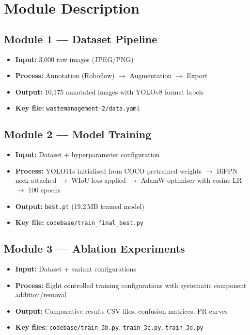 \section{Module Description}

\subsection{Module 1 — Dataset Pipeline}

\begin{itemize}
    \item \textbf{Input:} 3,000 raw images (JPEG/PNG)
    \item \textbf{Process:} Annotation (Roboflow) $\rightarrow$ Augmentation $\rightarrow$ Export
    \item \textbf{Output:} 10,175 annotated images with YOLOv8 format labels
    \item \textbf{Key file:} \texttt{wastemanagement-2/data.yaml}
\end{itemize}

\subsection{Module 2 — Model Training}

\begin{itemize}
    \item \textbf{Input:} Dataset + hyperparameter configuration
    \item \textbf{Process:} YOLO11s initialised from COCO pretrained weights $\rightarrow$ BiFPN neck attached $\rightarrow$ WIoU loss applied $\rightarrow$ AdamW optimiser with cosine LR $\rightarrow$ 100 epochs
    \item \textbf{Output:} \texttt{best.pt} (19.2\,MB trained model)
    \item \textbf{Key file:} \texttt{codebase/train\_final\_best.py}
\end{itemize}

\subsection{Module 3 — Ablation Experiments}

\begin{itemize}
    \item \textbf{Input:} Dataset + variant configurations
    \item \textbf{Process:} Eight controlled training configurations with systematic component addition/removal
    \item \textbf{Output:} Comparative results CSV files, confusion matrices, PR curves
    \item \textbf{Key files:} \texttt{codebase/train\_3b.py}, \texttt{train\_3c.py}, \texttt{train\_3d.py}
\end{itemize}


